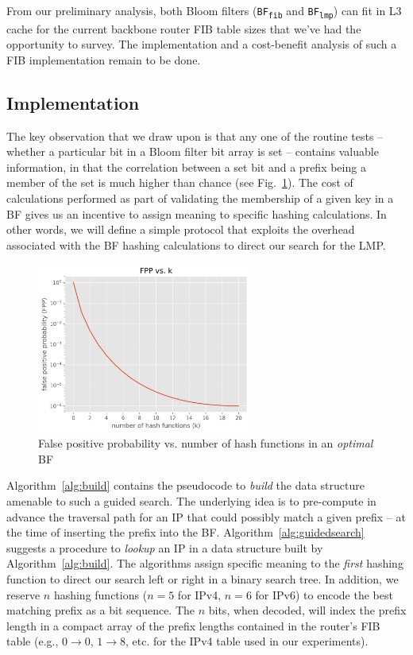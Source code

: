 \documentclass[conference,compsoc]{IEEEtran}
\begin{document}
From our preliminary analysis, both Bloom filters (\texttt{BF\textsubscript{fib}}
and \texttt{BF\textsubscript{lmp}}) can fit in L3 cache for the
current backbone router FIB table sizes that we've had the opportunity to
survey. The implementation and a cost-benefit analysis of such a FIB 
implementation remain to be done.


\subsection{Implementation}

The key observation that we draw upon is that any one of the routine
tests -- whether a particular bit in a Bloom filter bit array
is set -- contains valuable information, in that the correlation between
a set bit and a prefix being a member of the set is much higher than chance
(see Fig.~\ref{fig:fpp}). The cost of calculations performed as part of
validating the membership of a given key in a BF gives us an incentive to
assign meaning to specific hashing calculations. In other words, we will 
define a simple protocol that exploits the overhead associated with the
BF hashing calculations to direct our search for the LMP.

\begin{figure}[h]
\centering
\includegraphics[height=2.2in]{../img/PvsK.png}
  \caption{False positive probability vs. number of hash functions in an \emph{optimal} BF}
\label{fig:fpp}
\end{figure}


Algorithm~\ref{alg:build} contains the pseudocode to \emph{build} the data 
structure amenable to such a guided search. The underlying idea is to
pre-compute in advance the traversal path for an IP that could possibly match a given
prefix -- at the time of inserting the prefix into the BF.
Algorithm~\ref{alg:guidedsearch} suggests
a procedure to \emph{lookup} an IP in a data structure built by
Algorithm~\ref{alg:build}. The
algorithms assign specific meaning to the \emph{first} hashing function
to direct our search left or right in a binary search tree. In addition, we
reserve $n$ hashing functions ($n=5$ for IPv4, $n=6$ for IPv6) to encode
the best matching prefix as a bit sequence. The $n$ bits, when decoded,
will index the prefix length in a compact array of the prefix lengths
contained in the router's FIB table (e.g., $0 \rightarrow 0$, $1 \rightarrow 8$, etc.
for the IPv4 table used in our experiments).
\end{document}
